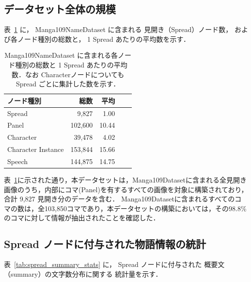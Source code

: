 \documentclass[a4j,12pt,dvipdfmx]{jsreport}
\begin{document}
\subsection{データセット全体の規模}
\label{sec:dataset_overview_stats}

表~\ref{tab:dataset_overview} に，
Manga109NameDataset に含まれる
見開き（Spread）ノード数，
および各ノード種別の総数と，
1 Spread あたりの平均数を示す．

\begin{table}[htbp]
   \centering
   \caption{Manga109NameDataset に含まれる各ノード種別の総数と 1 Spread あたりの平均数．なお Characterノードについても Spread ごとに集計した数を示す．}
   \label{tab:dataset_overview}
   \begin{tabular}{lrrrr}
      \hline
      \textbf{ノード種別}     & \textbf{総数} & \textbf{平均} \\
      \hline
      Spread             & 9{,}827     & 1.00        \\
      Panel              & 102{,}600   & 10.44       \\
      Character          & 39{,}478    & 4.02        \\
      Character Instance & 153{,}844   & 15.66       \\
      Speech             & 144{,}875   & 14.75       \\
      \hline
   \end{tabular}
\end{table}

表~\ref{tab:dataset_overview}に示された通り，本データセットは，Manga109Datasetに含まれる全見開き画像のうち，内部にコマ(Panel)を有するすべての画像を対象に構築されており，
合計 9{,}827 見開き分のデータを含む．
Manga109Datasetに含まれるすべてのコマの数は，全103,850コマであり，本データセットの構築においては，その98.8\%のコマに対して情報が抽出されたことを確認した．

\subsection{Spread ノードに付与された物語情報の統計}
\label{sec:spread_node_stats}
表~\ref{tab:spread_summary_stats} に，
Spread ノードに付与された
概要文（summary）の文字数分布に関する
統計量を示す．
\end{document}
